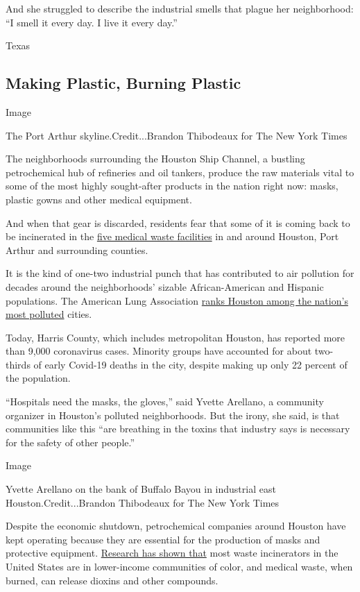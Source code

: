 And she struggled to describe the industrial smells that plague her
neighborhood: ``I smell it every day. I live it every day.''

Texas

\hypertarget{making-plastic-burning-plastic}{%
\subsection{Making Plastic, Burning
Plastic}\label{making-plastic-burning-plastic}}

Image

The Port Arthur skyline.Credit...Brandon Thibodeaux for The New York
Times

The neighborhoods surrounding the Houston Ship Channel, a bustling
petrochemical hub of refineries and oil tankers, produce the raw
materials vital to some of the most highly sought-after products in the
nation right now: masks, plastic gowns and other medical equipment.

And when that gear is discarded, residents fear that some of it is
coming back to be incinerated in the
\href{https://www.tceq.texas.gov/assets/public/permitting/waste/msw/medical-waste-facilities-active.pdf}{five
medical waste facilities} in and around Houston, Port Arthur and
surrounding counties.

It is the kind of one-two industrial punch that has contributed to air
pollution for decades around the neighborhoods' sizable African-American
and Hispanic populations. The American Lung Association
\href{http://www.stateoftheair.org/city-rankings/msas/houston-the-woodlands-tx.html\#ozone}{ranks
Houston among the nation's most polluted} cities.

Today, Harris County, which includes metropolitan Houston, has reported
more than 9,000 coronavirus cases. Minority groups have accounted for
about two-thirds of early Covid-19 deaths in the city, despite making up
only 22 percent of the population.

``Hospitals need the masks, the gloves,'' said Yvette Arellano, a
community organizer in Houston's polluted neighborhoods. But the irony,
she said, is that communities like this ``are breathing in the toxins
that industry says is necessary for the safety of other people.''

Image

Yvette Arellano on the bank of Buffalo Bayou in industrial east
Houston.Credit...Brandon Thibodeaux for The New York Times

Despite the economic shutdown, petrochemical companies around Houston
have kept operating because they are essential for the production of
masks and protective equipment.
\href{https://www.newschool.edu/pressroom/pressreleases/2019/incinerators.htm}{Research
has shown that} most waste incinerators in the United States are in
lower-income communities of color, and medical waste, when burned, can
release dioxins and other compounds.

